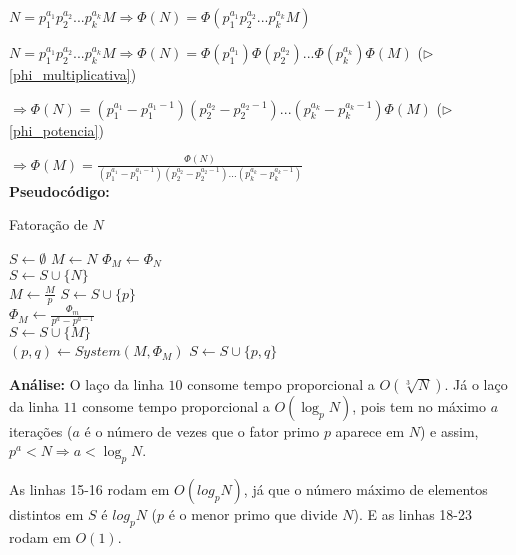 $N = p_1^{a_1}p_2^{a_2}...p_k^{a_k}M \Rightarrow \Phi(N) = \Phi(p_1^{a_1}p_2^{a_2}...p_k^{a_k}M)$

$N = p_1^{a_1}p_2^{a_2}...p_k^{a_k}M \Rightarrow \Phi(N) = \Phi(p_1^{a_1})\Phi(p_2^{a_2})...\Phi(p_k^{a_k})\Phi(M)$ ($\triangleright$ \autoref{phi_multiplicativa})

$\Rightarrow \Phi(N) = (p_1^{a_1}-p_1^{a_1-1})(p_2^{a_2} - p_2^{a_2-1})...(p_k^{a_k}-p_k^{a_k-1})\Phi(M)$ ($\triangleright$ \autoref{phi_potencia})

$\Rightarrow \Phi(M) = \frac{\Phi(N)}{(p_1^{a_1}-p_1^{a_1-1})(p_2^{a_2} - p_2^{a_2-1})...(p_k^{a_k}-p_k^{a_k-1})}$
\\

\textbf{Pseudocódigo:}
\begin{algorithm}
\caption{Fatoração de $N$}
\begin{algorithmic}[1]
\State $S \gets \emptyset$ 
\State $M \gets N$
\State $\Phi_M \gets \Phi_N$
\\
 
\State $S \gets S \cup \{N\}$
\State {}
\EndIf
\\
\State $M \gets \frac{M}{p}$
\State $S \gets S \cup \{p\}$
\EndWhile
\EndFor
\\
\State $\Phi_M \gets \frac{\Phi_m}{p^a - p^{a-1}}$ 
\EndFor
\\
 
\State $S \gets S \cup \{M\}$
\State {}
\EndIf
\\
\State $(p, q) \gets System(M, \Phi_M)$ 
\State $S \gets S \cup \{p, q\}$
\State {}

\EndProcedure
\end{algorithmic}
\end{algorithm}


\textbf{Análise:}
O laço da linha $10$ consome tempo proporcional a $O(\sqrt[3]N)$. Já o laço da linha $11$ consome tempo proporcional a $O(\log_pN)$, pois tem no máximo $a$ iterações ($a$ é o número de vezes que o fator primo $p$ aparece em $N$) e assim, $p^a < N \Rightarrow a < \log_p{N}$. 

As linhas 15-16 rodam em $O(log_pN)$, já que o número máximo de elementos distintos em $S$ é $log_pN$ ($p$ é o menor primo que divide $N$).
E as linhas 18-23 rodam em $O(1)$.

